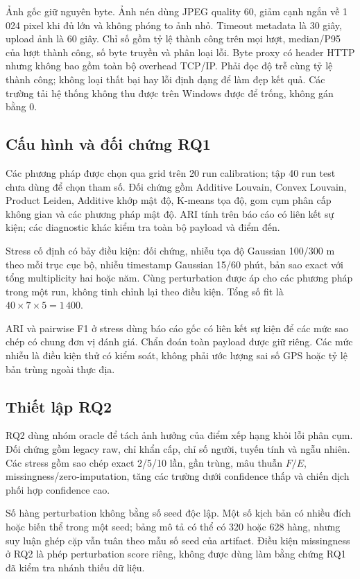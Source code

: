 Ảnh gốc giữ nguyên byte. Ảnh nén dùng JPEG quality 60, giảm cạnh ngắn về 1\,024 pixel khi đủ lớn và không phóng to ảnh nhỏ. Timeout metadata là 30 giây, upload ảnh là 60 giây. Chỉ số gồm tỷ lệ thành công trên mọi lượt, median/P95 của lượt thành công, số byte truyền và phân loại lỗi. Byte proxy có header HTTP nhưng không bao gồm toàn bộ overhead TCP/IP. Phải đọc độ trễ cùng tỷ lệ thành công; không loại thất bại hay lỗi định dạng để làm đẹp kết quả. Các trường tải hệ thống không thu được trên Windows được để trống, không gán bằng 0.

\subsection{Cấu hình và đối chứng RQ1}
Các phương pháp được chọn qua grid trên 20 run calibration; tập 40 run test chưa dùng để chọn tham số. Đối chứng gồm Additive Louvain, Convex Louvain, Product Leiden, Additive khớp mật độ, K-means tọa độ, gom cụm phân cấp không gian và các phương pháp mật độ. ARI tính trên báo cáo có liên kết sự kiện; các diagnostic khác kiểm tra toàn bộ payload và điểm đến.

Stress cố định có bảy điều kiện: đối chứng, nhiễu tọa độ Gaussian 100/300 m theo mỗi trục cục bộ, nhiễu timestamp Gaussian 15/60 phút, bản sao exact với tổng multiplicity hai hoặc năm. Cùng perturbation được áp cho các phương pháp trong một run, không tinh chỉnh lại theo điều kiện. Tổng số fit là $40\times7\times5=1\,400$.

ARI và pairwise F1 ở stress dùng báo cáo gốc có liên kết sự kiện để các mức sao chép có chung đơn vị đánh giá. Chẩn đoán toàn payload được giữ riêng. Các mức nhiễu là điều kiện thử có kiểm soát, không phải ước lượng sai số GPS hoặc tỷ lệ bản trùng ngoài thực địa.

\subsection{Thiết lập RQ2}
RQ2 dùng nhóm oracle để tách ảnh hưởng của điểm xếp hạng khỏi lỗi phân cụm. Đối chứng gồm legacy raw, chỉ khẩn cấp, chỉ số người, tuyến tính và ngẫu nhiên. Các stress gồm sao chép exact 2/5/10 lần, gần trùng, mâu thuẫn $F/E$, missingness/zero-imputation, tăng các trường dưới confidence thấp và chiến dịch phối hợp confidence cao.

Số hàng perturbation không bằng số seed độc lập. Một số kịch bản có nhiều đích hoặc biến thể trong một seed; bảng mô tả có thể có 320 hoặc 628 hàng, nhưng suy luận ghép cặp vẫn tuân theo mẫu số seed của artifact. Điều kiện missingness ở RQ2 là phép perturbation score riêng, không được dùng làm bằng chứng RQ1 đã kiểm tra nhánh thiếu dữ liệu.

